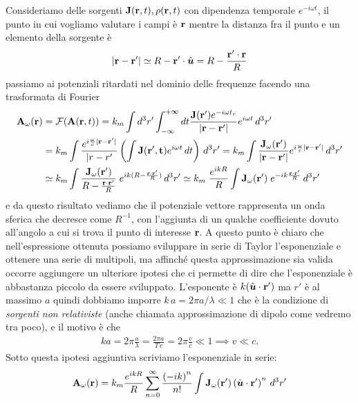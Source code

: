 Consideriamo delle sorgenti $ \mathbf{ J }(\mathbf{ r },t) , \rho(\mathbf{ r },t) $ con dipendenza temporale $ e^{-i\omega t} $, il punto in cui vogliamo 
valutare i campi è $ \mathbf{ r } $ mentre la distanza fra il punto e un elemento della sorgente è 
\begin{align}
  |\mathbf{ r-r' }| \simeq R - \mathbf{ r' } \cdot \hat{\boldsymbol{u}} = R - \frac{\mathbf{ r'\cdot r }}{R}
\end{align}
passiamo ai potenziali ritardati nel dominio delle frequenze facendo una trasformata di Fourier
\begin{align}
  \mathbf{ A }_\omega (\mathbf{ r }) &= \mathcal{F}(\mathbf{ A }(\mathbf{ r },t)) 
  = k_m \int d^3r' \int_{-\infty}^{+\infty} dt \frac{\mathbf{ J }(\mathbf{ r' }) e^{-i\omega t_r}}{|\mathbf{r-r'}|} e^{i\omega t} \,d^3r' 
  \\
  &= k_m \int  \frac{e^{i\frac\omega{c} |\mathbf{r - r'}|}}{|r - r'} \left( \int \mathbf{J(\mathbf{r'}, t)} e^{i\omega t} \,dt \right) \, d^3 r'
  = k_m \int  \frac{\mathbf{ J }_\omega(\mathbf{ r' })}{|\mathbf{r-r'}|} e^{i\frac{\omega}{c} |\mathbf{r - r'}| } \,d^3r' 
  \\
  &\simeq k_m \int  \frac{\mathbf{ J }_\omega(\mathbf{ r' })}{R - \frac{\mathbf{r\cdot r'}}{R}}\; e^{i k (R - \frac{\mathbf{r\cdot r'}}{R})} \,d^3r' 
  \simeq k_m\; \frac{e^{ik R}}{R} \int \mathbf{J}_\omega(\mathbf{r'}) \; e^{-ik \frac{ \mathbf{r\cdot r'} }{ R }} \,d^3r'
\end{align}
e da questo risultato vediamo che il potenziale vettore rappresenta un onda sferica che decresce come $ R^{-1} $, con l'aggiunta di un qualche 
coefficiente dovuto all'angolo a cui si trova il punto di interesse $ \mathbf{r} $. A questo punto è chiaro che nell'espressione ottenuta possiamo sviluppare 
in serie di Taylor l'esponenziale e ottenere una serie di multipoli, ma affinché questa approssimazione sia valida occorre aggiungere un ulteriore ipotesi 
che ci permette di dire che l'esponenziale è abbastanza piccolo da essere sviluppato. L'esponente è $ k (\hat{\boldsymbol{u}} \cdot \mathbf{r'}) $ ma $ r' $ è al massimo $ a $
quindi dobbiamo imporre $ k\, a = 2\pi a/\lambda \ll 1 $ che è la condizione di \textit{sorgenti non relativiste} (anche chiamata approssimazione di 
dipolo come vedremo tra poco), e il motivo è che
\begin{align}
  ka = 2\pi \frac{a}{\lambda} = \frac{2\pi a}{T \,c} = 2\pi \frac{v}{c} \ll 1 \implies v \ll c.
\end{align}
Sotto questa ipotesi aggiuntiva scriviamo l'esponenziale in serie:
\begin{align}
  \mathbf{A}_\omega(\mathbf{r}) = k_m \frac{e^{ikR}}{R} 
  \sum_{n = 0}^\infty \frac{\left( -ik \right)^n}{n!} \int \mathbf{J}_\omega(\mathbf{r'}) \left( \hat{\boldsymbol{u}}\cdot \mathbf{r'} \right)^n \,d^3r'
\end{align}
